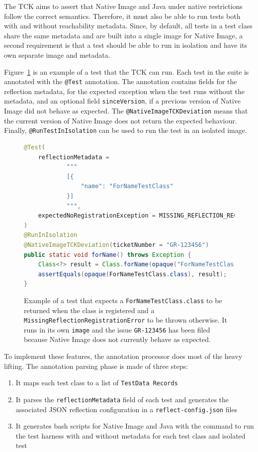 The TCK aims to assert that Native Image and Java under native restrictions follow the correct semantics. Therefore, it must also be able to run tests both with and without reachability metadata. Since, by default, all tests in a test class share the same metadata and are built into a single image for Native Image, a second requirement is that a test should be able to run in isolation and have its own separate image and metadata. 

Figure~\ref{fig:tck_for_name} is an example of a test that the TCK can run. Each test in the suite is annotated with the \verb|@Test| annotation. The annotation contains fields for the reflection metadata, for the expected exception when the test runs without the metadata, and an optional field \verb|sinceVersion|, if a previous version of Native Image did not behave as expected. The \verb|@NativeImageTCKDeviation| means that the current version of Native Image does not return the expected behaviour. Finally, \verb|@RunTestInIsolation| can be used to run the test in an isolated image. 

\begin{figure}[ht]
    \centering
\begin{lstlisting}[language=Java]
@Test(
    reflectionMetadata =
            """
            [{
                "name": "ForNameTestClass"
            }]
            """,
    expectedNoRegistrationException = MISSING_REFLECTION_REGISTRATION_ERROR
)
@RunInIsolation
@NativeImageTCKDeviation(ticketNumber = "GR-123456")
public static void forName() throws Exception {
    Class<?> result = Class.forName(opaque("ForNameTestClass"));
    assertEquals(opaque(ForNameTestClass.class), result);
}
\end{lstlisting}
    \caption{Example of a test that expects a \texttt{ForNameTestClass.class} to be returned when the class is registered and a \texttt{MissingReflectionRegistrationError} to be thrown otherwise. It runs in its own \texttt{image} and the issue \texttt{GR-123456} has been filed because Native Image does not currently behave as expected.}
    \label{fig:tck_for_name}
\end{figure}

To implement these features, the annotation processor does most of the heavy lifting. The annotation parsing phase is made of three steps:
\begin{enumerate}
    \item It maps each test class to a list of \verb|TestData Records| 
    \item It parses the \verb|reflectionMetadata| field of each test and generates the associated JSON reflection configuration in a \verb|reflect-config.json| files
    \item It generates bash scripts for Native Image and Java with the command to run the test harness with and without metadata for each test class and isolated test
\end{enumerate}

